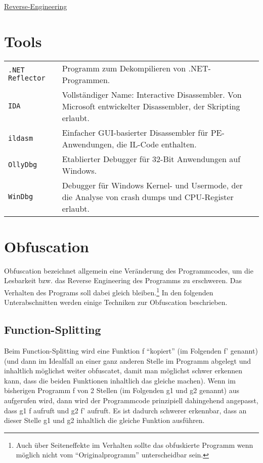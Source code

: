 \raggedright
\footnotesize
\begin{multicols}{3}	
	\setlength{\premulticols}{1pt}
	\setlength{\postmulticols}{1pt}
	\setlength{\multicolsep}{1pt}
	\setlength{\columnsep}{2pt}

\begin{center}
     \Large{\underline{Reverse-Engineering}} \\
\end{center}

\section{Tools}
\begin{tabular}{@{}p{\the\MyLen}
		@{}p{\linewidth-\the\MyLen}@{}}
	\texttt{.NET Reflector} & Programm zum Dekompilieren von .NET-Programmen.\\
	\texttt{IDA} &  Vollständiger Name: Interactive Disassembler. Von Microsoft entwickelter Disassembler, der Skripting erlaubt. \\
	\texttt{ildasm} & Einfacher GUI-basierter Disassembler für PE-Anwendungen, die IL-Code enthalten.\\
	\texttt{OllyDbg} & Etablierter Debugger für 32-Bit Anwendungen auf Windows.\\
	\texttt{WinDbg} & Debugger für Windows Kernel- und Usermode, der die Analyse von crash dumps und CPU-Register erlaubt.\\
\end{tabular}
\section{Obfuscation}
Obfuscation bezeichnet allgemein eine Veränderung des Programmcodes, um die Lesbarkeit bzw. das Reverse Engineering des Programms zu erschweren. Das Verhalten des Programs soll dabei gleich bleiben.\footnote{Auch über Seiteneffekte im Verhalten sollte das obfuskierte Programm wenn möglich nicht vom \enquote{Originalprogramm} unterscheidbar sein.} In den folgenden Unterabschnitten werden einige Techniken zur Obfuscation beschrieben.
\subsection{Function-Splitting}
Beim Function-Splitting wird eine Funktion f \enquote{kopiert} (im Folgenden f' genannt) (und dann im Idealfall an einer ganz anderen Stelle im Programm abgelegt und inhaltlich möglichst weiter obfuscatet, damit man möglichst schwer erkennen kann, dass die beiden Funktionen inhaltlich das gleiche machen). Wenn im bisherigen Programm f von 2 Stellen (im Folgenden g1 und g2 genannt) aus aufgerufen wird, dann wird der Programmcode prinzipiell dahingehend angepasst, dass g1 f aufruft und g2 f' aufruft. Es ist dadurch schwerer erkennbar, dass an dieser Stelle g1 und g2 inhaltlich die gleiche Funktion ausführen.

\end{multicols}
